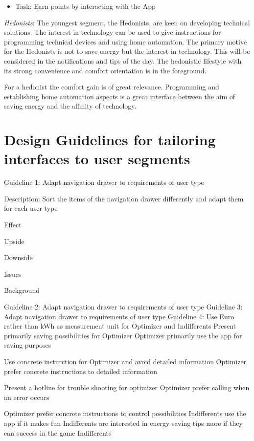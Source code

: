 \begin{enumerate}
	\begin{itemize}
		\item Task: Earn points by interacting with the App
	\end{itemize}
	
	\textit{Hedonists}:
	The youngest segment, the Hedonists, are keen on developing technical solutions. The interest in technology can be used to give instructions for programming technical devices and using home automation. The primary motive for the Hedonists is not to save energy but the interest in technology. This will be considered in the notifications and tips of the day. The hedonistic lifestyle with its strong convenience and comfort orientation is in the foreground.
	
	For a hedonist the comfort gain is of great relevance. Programming and establishing home automation aspects is a great interface between the aim of saving energy and the affinity of technology.
	
	
\end{enumerate}

\section{Design Guidelines for tailoring interfaces to user segments}

Guideline 1: Adapt navigation drawer to requirements of user type

Description: Sort the items of the navigation drawer differently and adapt them for each user type

Effect

Upside

Downside

Issues

Background

Guideline 2: Adapt navigation drawer to requirements of user type
Guideline 3: Adapt navigation drawer to requirements of user type
Guideline 4: Use Euro rather than kWh as measurement unit for Optimizer and Indifferents
Present primarily saving possibilities for Optimizer
Optimizer primarily use the app for saving purposes

Use concrete insturction for Optimizer and avoid detailed information
Optimizer prefer concrete instructions to detailed information

Present a hotline for trouble shooting for optimizer
Optimizer prefer calling when an error occurs


Optimizer prefer concrete instructions to control possibilities
Indifferents use the app if it makes fun
Indifferents are interested in energy saving tips more if they can success in the game
Indifferents


